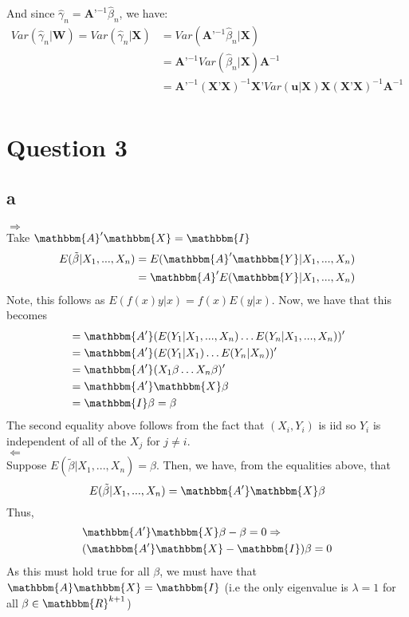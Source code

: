 \documentclass[12pt]{paper}
\begin{document}
And since $\hat{\gamma}_n=\textbf{A'}^{-1}\hat{\beta}_n$, we have:
\begin{equation}
\begin{split}
Var(\hat{\gamma}_n|\textbf{W})=Var(\hat{\gamma}_n|\textbf{X})&=Var(\textbf{A'}^{-1}\hat{\beta}_n|\textbf{X})\\
&=\textbf{{A'}}^{-1}Var(\hat{\beta}_n|\textbf{X})\textbf{A}^{-1}\\
&=\textbf{{A'}}^{-1}(\textbf{X'X})^{-1}\textbf{X'}Var(\textbf{u}|\textbf{X})\textbf{X}(\textbf{X'X})^{-1}\textbf{A}^{-1}\\
\end{split}
\end{equation}


\section*{Question 3}
\subsection*{a}
$\Rightarrow$ \\
Take $\mathbbm{A}'\mathbbm{X} = \mathbbm{I}$
\begin{align}
    E(\tilde \beta | X_1,...,X_n) & = E(\mathbbm{A}' \mathbbm{Y}|X_1,...,X_n ) \\
&=  \mathbbm{A}' E( \mathbbm{Y} | X_1,...,X_n)
\end{align}
Note, this follows as $E(f(x)y|x) = f(x)E(y|x)$.
Now, we have that this becomes
\begin{align*}
 & = \mathbbm{A'}(E(Y_1|X_1,...,X_n) \dots E(Y_n|X_1,...,X_n))' \\
&=  \mathbbm{A'}(E(Y_1|X_1) \dots E(Y_n|X_n))' \\
&=  \mathbbm{A'}(X_1\beta \dots X_n\beta)' \\
&=  \mathbbm{A'}\mathbbm{X}\beta \\
&=  \mathbbm{I}\beta = \beta \\
\end{align*}
The second equality above follows from the fact that $(X_i,Y_i)$ is iid so $Y_i$ is independent of all of the $X_j$ for $j \neq i$. \\
$\Leftarrow$ \\
Suppose $ E(\tilde \beta | X_1,...,X_n) = \beta$. Then, we have, from the equalities above, that  
$$E(\tilde \beta | X_1,...,X_n) =  \mathbbm{A'}\mathbbm{X}\beta $$
Thus,
\begin{align*}
     & \mathbbm{A'}\mathbbm{X}\beta - \beta = 0  \Rightarrow \\
    & (\mathbbm{A'}\mathbbm{X} - \mathbbm{I})\beta = 0
\end{align*}  
As this must hold true for all $\beta$, we must have that $\mathbbm{A}\mathbbm{X} = \mathbbm{I}$ (i.e the only eigenvalue is $\lambda = 1$ for all $\beta \in \mathbbm{R}^{k+1}$)
\end{document}
